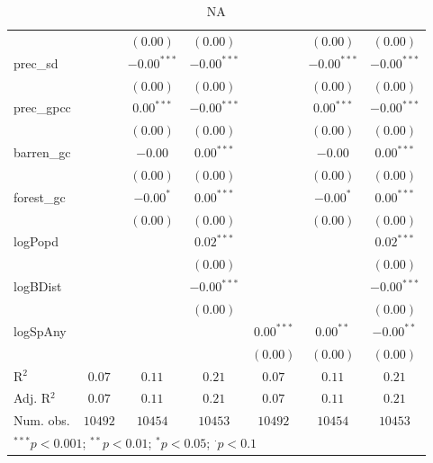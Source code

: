 \begin{sidewaystable}
\begin{center}
{\begin{tabular}{l c c c c c c}
                &               & $(0.00)$      & $(0.00)$      &               & $(0.00)$      & $(0.00)$      \\
prec\_sd        &               & $-0.00^{***}$ & $-0.00^{***}$ &               & $-0.00^{***}$ & $-0.00^{***}$ \\
                &               & $(0.00)$      & $(0.00)$      &               & $(0.00)$      & $(0.00)$      \\
prec\_gpcc      &               & $0.00^{***}$  & $-0.00^{***}$ &               & $0.00^{***}$  & $-0.00^{***}$ \\
                &               & $(0.00)$      & $(0.00)$      &               & $(0.00)$      & $(0.00)$      \\
barren\_gc      &               & $-0.00$       & $0.00^{***}$  &               & $-0.00$       & $0.00^{***}$  \\
                &               & $(0.00)$      & $(0.00)$      &               & $(0.00)$      & $(0.00)$      \\
forest\_gc      &               & $-0.00^{*}$   & $0.00^{***}$  &               & $-0.00^{*}$   & $0.00^{***}$  \\
                &               & $(0.00)$      & $(0.00)$      &               & $(0.00)$      & $(0.00)$      \\
logPopd         &               &               & $0.02^{***}$  &               &               & $0.02^{***}$  \\
                &               &               & $(0.00)$      &               &               & $(0.00)$      \\
logBDist        &               &               & $-0.00^{***}$ &               &               & $-0.00^{***}$ \\
                &               &               & $(0.00)$      &               &               & $(0.00)$      \\
logSpAny        &               &               &               & $0.00^{***}$  & $0.00^{**}$   & $-0.00^{**}$  \\
                &               &               &               & $(0.00)$      & $(0.00)$      & $(0.00)$      \\
\hline
R$^2$           & $0.07$        & $0.11$        & $0.21$        & $0.07$        & $0.11$        & $0.21$        \\
Adj. R$^2$      & $0.07$        & $0.11$        & $0.21$        & $0.07$        & $0.11$        & $0.21$        \\
Num. obs.       & $10492$       & $10454$       & $10453$       & $10492$       & $10454$       & $10453$       \\
\hline
\multicolumn{7}{l}{\scriptsize{$^{***}p<0.001$; $^{**}p<0.01$; $^{*}p<0.05$; $^{\cdot}p<0.1$}}
\end{tabular}
}
\caption{NA}
\label{nightlights}
\end{center}
\end{sidewaystable}
